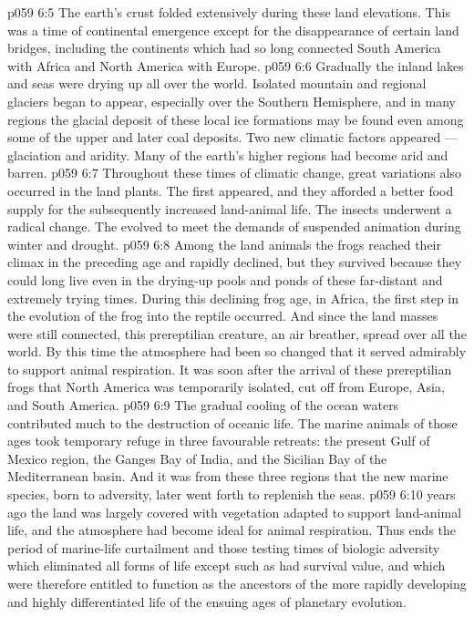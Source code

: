 \vs p059 6:5 The earth’s crust folded extensively during these land elevations. This was a time of continental emergence except for the disappearance of certain land bridges, including the continents which had so long connected South America with Africa and North America with Europe.
\vs p059 6:6 Gradually the inland lakes and seas were drying up all over the world. Isolated mountain and regional glaciers began to appear, especially over the Southern Hemisphere, and in many regions the glacial deposit of these local ice formations may be found even among some of the upper and later coal deposits. Two new climatic factors appeared --- glaciation and aridity. Many of the earth’s higher regions had become arid and barren.
\vs p059 6:7 \pc Throughout these times of climatic change, great variations also occurred in the land plants. The  first appeared, and they afforded a better food supply for the subsequently increased land\hyp{}animal life. The insects underwent a radical change. The  evolved to meet the demands of suspended animation during winter and drought.
\vs p059 6:8 \pc Among the land animals the frogs reached their climax in the preceding age and rapidly declined, but they survived because they could long live even in the drying\hyp{}up pools and ponds of these far\hyp{}distant and extremely trying times. During this declining frog age, in Africa, the first step in the evolution of the frog into the reptile occurred. And since the land masses were still connected, this prereptilian creature, an air breather, spread over all the world. By this time the atmosphere had been so changed that it served admirably to support animal respiration. It was soon after the arrival of these prereptilian frogs that North America was temporarily isolated, cut off from Europe, Asia, and South America.
\vs p059 6:9 The gradual cooling of the ocean waters contributed much to the destruction of oceanic life. The marine animals of those ages took temporary refuge in three favourable retreats: the present Gulf of Mexico region, the Ganges Bay of India, and the Sicilian Bay of the Mediterranean basin. And it was from these three regions that the new marine species, born to adversity, later went forth to replenish the seas.
\vs p059 6:10 \pc {} years ago the land was largely covered with vegetation adapted to support land\hyp{}animal life, and the atmosphere had become ideal for animal respiration. Thus ends the period of marine\hyp{}life curtailment and those testing times of biologic adversity which eliminated all forms of life except such as had survival value, and which were therefore entitled to function as the ancestors of the more rapidly developing and highly differentiated life of the ensuing ages of planetary evolution.
